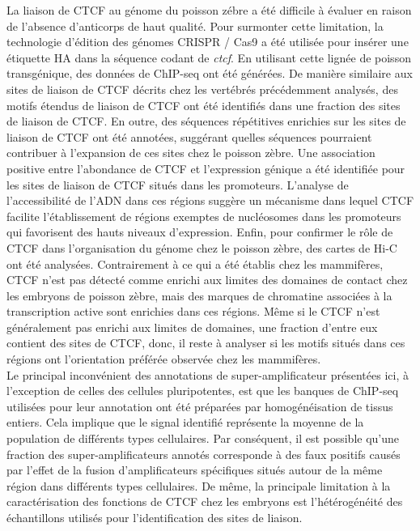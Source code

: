 		La liaison de CTCF au g\'enome du poisson z\'ebre a \'et\'e difficile \`a \'evaluer en raison de l'absence d'anticorps de haut qualit\'e. Pour surmonter cette limitation, la technologie d'\'edition des g\'enomes CRISPR / Cas9 a \'et\'e utilis\'ee pour ins\'erer une \'etiquette HA dans la s\'equence codant de \textit{ctcf}. En utilisant cette lign\'ee de poisson transg\'enique, des donn\'ees de ChIP-seq ont \'et\'e g\'en\'er\'ees. De mani\`ere similaire aux sites de liaison de CTCF d\'ecrits chez les vert\'ebr\'es pr\'ec\'edemment analys\'es, des motifs \'etendus de liaison de CTCF ont \'et\'e identifi\'es dans une fraction des sites de liaison de CTCF. En outre, des s\'equences r\'ep\'etitives enrichies sur les sites de liaison de CTCF ont \'et\'e annot\'ees, sugg\'erant quelles s\'equences pourraient contribuer \`a l'expansion de ces sites chez le poisson z\`ebre. Une association positive entre l'abondance de CTCF et l'expression g\'enique a \'et\'e identifi\'ee pour les sites de liaison de CTCF situ\'es dans les promoteurs. L'analyse de l'accessibilit\'e de l'ADN dans ces r\'egions sugg\`ere un m\'ecanisme dans lequel CTCF facilite l'\'etablissement de r\'egions exemptes de nucl\'eosomes dans les promoteurs qui favorisent des hauts niveaux d'expression. Enfin, pour confirmer le r\^ole de CTCF dans l'organisation du g\'enome chez le poisson z\`ebre, des cartes de Hi-C ont \'et\'e analys\'ees. Contrairement \`a ce qui a \'et\'e \'etablis chez les mammifères, CTCF n'est pas d\'etect\'e comme enrichi aux limites des domaines de contact chez les embryons de poisson z\`ebre, mais des marques de chromatine associ\'ees à la transcription active sont enrichies dans ces r\'egions. M\^eme si le CTCF n'est g\'en\'eralement pas enrichi aux limites de domaines, une fraction d'entre eux contient des sites de CTCF, donc, il reste \`a analyser si les motifs situ\'es dans ces r\'egions ont l'orientation pr\'ef\'er\'ee observ\'ee chez les mammif\`eres.\\

		Le principal inconv\'enient des annotations de super-amplificateur pr\'esent\'ees ici, \`a l'exception de celles des cellules pluripotentes, est que les banques de ChIP-seq utilis\'ees pour leur annotation ont \'et\'e pr\'epar\'ees par homog\'en\'eisation de tissus entiers. Cela implique que le signal identifi\'e repr\'esente la moyenne de la population de diff\'erents types cellulaires. Par cons\'equent, il est possible qu'une fraction des super-amplificateurs annot\'es corresponde \`a des faux positifs caus\'es par l'effet de la fusion d'amplificateurs sp\'ecifiques situ\'es autour de la m\^eme r\'egion dans diff\'erents types cellulaires. De m\^eme, la principale limitation \`a la caract\'erisation des fonctions de CTCF chez les embryons est l'h\'et\'erog\'en\'eit\'e des \'echantillons utilis\'es pour l'identification des sites de liaison.\\

